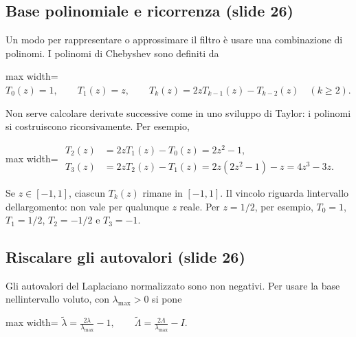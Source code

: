 \documentclass[11pt,a4paper,oneside,openany]{book}
\begin{document}
\subsection{Base polinomiale e ricorrenza (slide 26)}\label{f05-r405}

Un modo per rappresentare o approssimare il filtro è usare una combinazione di polinomi. I polinomi di Chebyshev sono definiti da

\begin{center}
\begin{adjustbox}{max width=\linewidth}
$\displaystyle \boxed{T_0(z)=1,\qquad T_1(z)=z,\qquad
T_k(z)=2zT_{k-1}(z)-T_{k-2}(z)\quad(k\ge2).}$
\end{adjustbox}
\end{center}

Non serve calcolare derivate successive come in uno sviluppo di Taylor: i polinomi si costruiscono ricorsivamente. Per esempio,

\begin{center}
\begin{adjustbox}{max width=\linewidth}
$\displaystyle \begin{aligned}
T_2(z)&=2zT_1(z)-T_0(z)=2z^2-1,\\
T_3(z)&=2zT_2(z)-T_1(z)=2z(2z^2-1)-z=4z^3-3z.
\end{aligned}$
\end{adjustbox}
\end{center}

Se \(z\in[-1,1]\), ciascun \(T_k(z)\) rimane in \([-1,1]\). Il vincolo riguarda l\textquotesingle intervallo dell\textquotesingle argomento: non vale per qualunque \(z\) reale. Per \(z=1/2\), per esempio, \(T_0=1\), \(T_1=1/2\), \(T_2=-1/2\) e \(T_3=-1\).

\subsection{Riscalare gli autovalori (slide 26)}\label{f05-r421}

Gli autovalori del Laplaciano normalizzato sono non negativi. Per usare la base nell\textquotesingle intervallo voluto, con \(\lambda_{\max}>0\) si pone

\begin{center}
\begin{adjustbox}{max width=\linewidth}
$\displaystyle \widetilde\lambda=\frac{2\lambda}{\lambda_{\max}}-1,\qquad
\widetilde\Lambda=\frac{2\Lambda}{\lambda_{\max}}-I.$
\end{adjustbox}
\end{center}
\end{document}
